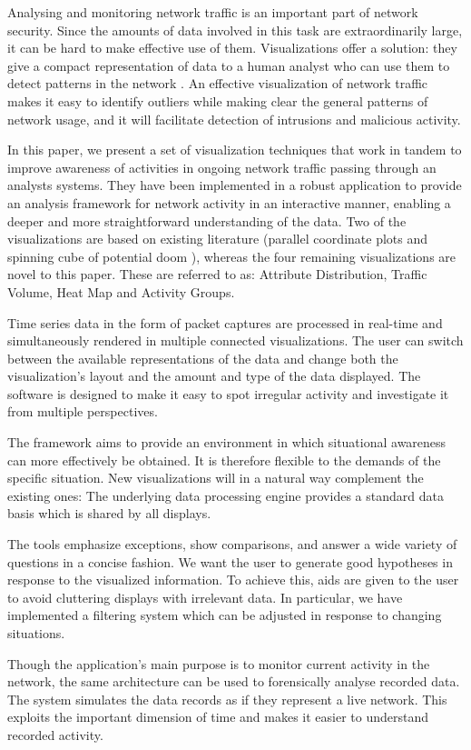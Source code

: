 Analysing and monitoring network traffic is an important part of network security. Since the amounts of data involved in this task are extraordinarily large, it can be hard to make effective use of them. Visualizations offer a solution: they give a compact representation of data to a human analyst who can use them to detect patterns in the network \cite{ware2012information}. An effective visualization of network traffic makes it easy to identify outliers while making clear the general patterns of network usage, and it will facilitate detection of intrusions and malicious activity.

In this paper, we present a set of visualization techniques that work in tandem to improve awareness of activities in ongoing network traffic passing through an analysts systems. They have been implemented in a robust application to provide an analysis framework for 
network activity in an interactive manner, enabling a deeper and more straightforward understanding of the data. Two of the visualizations are based on existing literature (parallel coordinate plots \cite{inselberg1985plane} and spinning cube of potential doom \cite{cube04}), whereas the four remaining visualizations are novel to this paper. These are referred to as: Attribute Distribution, Traffic Volume, Heat Map and Activity Groups.  

Time series data in the form of packet captures are processed in real-time and simultaneously rendered in multiple connected visualizations. The user can switch between the available representations of the data and change both the visualization's layout and the amount and type of the data displayed. The software is designed to make it easy to spot irregular activity and investigate it from multiple perspectives.

The framework aims to provide an environment in which situational awareness can more effectively be obtained. It is therefore flexible to the demands of the specific situation. New visualizations will in a natural way complement the existing ones: The underlying data processing engine provides a standard data basis which is shared by all displays.

The tools emphasize exceptions, show comparisons, and answer a wide variety of questions in a concise fashion. We want the user to generate good hypotheses in response to the visualized information. To achieve this, aids are given to the user to avoid cluttering displays with irrelevant data. In particular, we have implemented a filtering system which can be adjusted in response to changing situations.

Though the application's main purpose is to monitor current activity in the network, the same architecture can be used to forensically analyse recorded data. The system simulates the data records as if they represent a live network. This exploits the important dimension of time and makes it easier to understand recorded activity.
